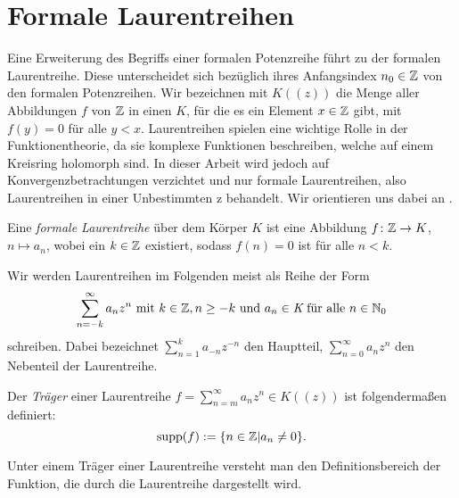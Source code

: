 \section{Formale Laurentreihen}
%
Eine Erweiterung des Begriffs einer formalen Potenzreihe führt zu der formalen Laurentreihe. Diese unterscheidet sich bezüglich ihres Anfangsindex $n_0 \in \mathbb{Z}$ von den formalen Potenzreihen. Wir bezeichnen mit $K((z))$ die Menge aller Abbildungen $f$ von $\mathbb{Z}$ in einen $K$, für die es ein Element $x \in \mathbb{Z}$ gibt, mit $f(y) = 0$ für alle $y < x $. \newline 
Laurentreihen spielen eine wichtige Rolle in der Funktionentheorie, da sie komplexe Funktionen beschreiben, welche auf einem Kreisring holomorph sind. In dieser Arbeit wird jedoch auf Konvergenzbetrachtungen verzichtet und nur formale Laurentreihen, also Laurentreihen in einer Unbestimmten z behandelt. %
Wir orientieren uns dabei an \cite[S. 563 - 572]{Lueneburg08}.
%
\begin{defn}
Eine \textit{formale Laurentreihe} über dem Körper $K$ ist eine Abbildung $f \colon \mathbb{Z} \rightarrow K$, $n \mapsto a_n$, wobei ein $k\in \mathbb{Z}$ existiert, sodass $f(n) = 0$ ist für alle $n < k$.
\end{defn}
%
%
\begin{nota}
Wir werden Laurentreihen im Folgenden meist als Reihe der Form
\begin{equation*}
\sum_{n= - k}^{\infty}a_nz^n \text{ mit } k \in \mathbb{Z}, n \ge -k \text{ und }a_n \in\textit{K}\text{ für alle } n\in\mathbb{N}_0 
\end{equation*} 
schreiben.
Dabei bezeichnet $\sum_{n=1}^{k}a_{-n}z^{-n}$ den Hauptteil, $\sum_{n=0}^{\infty}a_nz^n$ den Nebenteil der Laurentreihe. 
\end{nota}
%
%
%
%
%
%
%
%
%
%
% 
\begin{defn}\label{traeger}
Der \textit{Träger} einer Laurentreihe $f = \sum_{n =m}^{\infty} a_nz^n \in K((z))$ ist folgendermaßen definiert: 
\[\text{supp}(f) := \lbrace n \in \mathbb{Z} | a_n \neq 0 \rbrace.\] 
\end{defn}
%
%
%
%
\begin{bem}
Unter einem Träger einer Laurentreihe versteht man den Definitionsbereich der Funktion, die durch die Laurentreihe dargestellt wird.
\end{bem}
%
%
%
%
